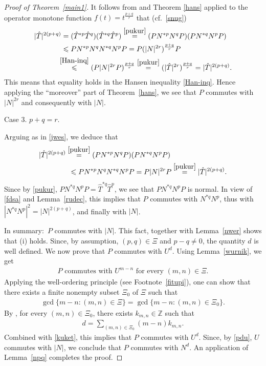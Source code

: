 \documentclass[reqno]{amsproc}
\numberwithin{equation}{section}
\theoremstyle{remark}
\theoremstyle{definition}
\newcommand*{\Le}{\leqslant}
\newcommand*{\zbb}{\mathbb{Z}}
\begin{document}
\begin{proof}[Proof of Theorem~\ref{main1}]
It follows from \cite[Lemma~3.2]{P-S-roots23} and
Theorem \ref{hans} applied to the operator monotone
function $f(t)=t^{\frac{p+q}{r}}$ that (cf.\
\eqref{snug})
   \allowdisplaybreaks
   \begin{align} \notag
|\hat{T}|^{2(p+q)} & =(\hat T^{*p}\hat
T^q)(\hat T^{*q} \hat T^p)
\overset{\eqref{pukur}} =
(PN^{*p}N^qP)(PN^{*q}N^p P)
    \\ \notag
& \Le PN^{*p}N^qN^{*q}N^pP=
P(|N|^{2r})^{\frac{p+q}{r}}P
   \\  \label{jwes}
& \hspace{-1.1ex} \overset{\eqref{Han-inq}}\Le
(P|N|^{2r}P)^{\frac{p+q}{r}} \overset{\eqref{pukur}} =
(|\hat{T}|^{2r})^{\frac{p+q}{r}} = |\hat{T}|^{2(p+q)}.
   \end{align}
This means that equality holds in the Hansen
inequality \eqref{Han-inq}. Hence applying
the ``moreover'' part of Theorem~\ref{hans},
we see that $P$ commutes with $|N|^{2r}$ and
consequently with $|N|$.

{\sc Case 3.} $p+q=r$.

Arguing as in \eqref{jwes}, we deduce that
   \begin{align} \notag
|\hat{T}|^{2(p+q)} & \overset{\eqref{pukur}}
= (PN^{*p}N^qP) (PN^{*q}N^pP)
   \\  \label{fdsa}
& \hspace{1ex} \Le PN^{*p}N^qN^{*q}N^pP= P|N|^{2r}P
\overset{\eqref{pukur}} = |\hat{T}|^{2(p+q)}.
   \end{align}
Since by \eqref{pukur}, $PN^{*q}N^p P = \hat
T^{*q} \hat T^p$, we see that $PN^{*q}N^p P$
is normal. In view of \eqref{fdsa} and
Lemma~\ref{rudec}, this implies that $P$
commutes with $N^{*q}N^p$, thus with
$|N^{*q}N^p|^2=|N|^{2(p+q)}$, and finally
with $|N|$.

In summary:\ $P$ commutes with $|N|$. This fact,
together with Lemma~\ref{nwer} shows that (i) holds.
Since, by assumption, $(p,q)\in \varXi$ and $p-q\neq
0$, the quantity $d$ is well defined. We now prove
that $P$ commutes with $U^d$. Using
Lemma~\ref{wurnik}, we get
   \begin{align} \label{kuket}
\text{$P$ commutes with $U^{m-n}$ for every $(m,n)\in
\varXi$.}
   \end{align}
Applying the well-ordering principle (see
Footnote~\ref{fitupi}), one can show that there exists
a finite nonempty subset $\varXi_0$ of $\varXi$ such
that
   \begin{align*}
\gcd\{m-n\colon (m,n)\in \varXi\} = \gcd\{m-n\colon
(m,n)\in \varXi_0\}.
   \end{align*}
By \cite[Theorem~4, p.\ 10]{Sh67}, for every
$(m,n)\in\varXi_0$, there exists $k_{m,n}\in \zbb$
such that
   \begin{align*}
d=\sum_{(m,n) \in \varXi_0} (m-n)k_{m,n}.
   \end{align*}
Combined with \eqref{kuket}, this implies
that $P$ commutes with $U^d$. Since, by
\eqref{pdu}, $U$ commutes with $|N|$, we
conclude that $P$ commutes with $N^{d}$. An
application of Lemma~\ref{npq} completes the
proof.
   \end{proof}
\end{document}
